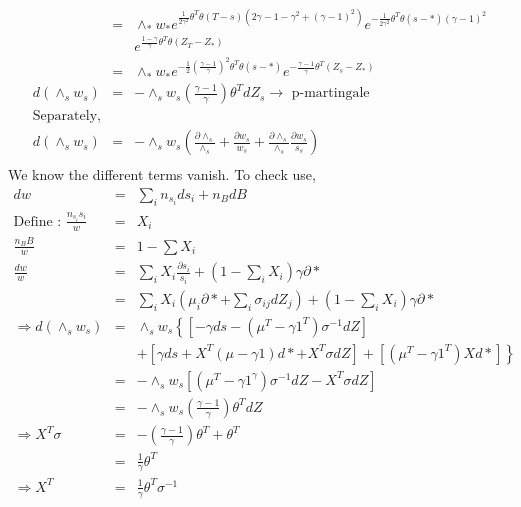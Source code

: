 \documentclass[]{article}
\begin{document}
\begin{eqnarray*}
&=& \wedge _* w_* e^{\frac{1}{2\gamma ^2} \theta ^T \theta \left(T-s\right)\left(2\gamma -1-\gamma ^2 + \left( \gamma -1\right)^2 \right)} e^{-\frac{1}{2\gamma ^2} \theta ^T \theta \left(s-*\right)\left(\gamma -1\right)^2}\\ && e^{\frac{1-\gamma}{\gamma} \theta ^T \theta \left(Z_T - Z_*\right)}\\
&=& \wedge _* w_* e^{-\frac{1}{2} \left(\frac{\gamma -1}{\gamma}\right)^2 \theta ^T \theta \left(s-*\right)} e^{-\frac{\gamma - 1}{\gamma} \theta ^T \left(Z_s-Z_*\right)}\\
d\left(\wedge _s w_s\right) &=& -\wedge _s w_s \left(\frac{\gamma -1}{\gamma}\right) \theta ^T dZ_s \rightarrow \mbox{ p-martingale}\\
\mbox{Separately,}\\
d\left(\wedge _s w_s\right) &=& -\wedge _s w_s \left(\frac{\partial \wedge _s}{\wedge _s} + \frac{\partial w_s}{w_s} + \frac{\partial \wedge _s}{\wedge _s} \frac{\partial w_s}{s_s}\right)\\
\end{eqnarray*}
We know the different terms vanish. To check use,
\begin{eqnarray*}
dw &=& \sum_{i} n_{s_i} ds_i + n_B dB\\
\mbox{Define : } \frac{n_{s_i} s_i}{w} &=& X_i \\
\frac{n_B B}{w} &=& 1-\sum X_i\\
\frac{dw}{w} &=& \sum_{i} X_i \frac{\partial s_i}{s_i} + \left( 1- \sum_{i} X_i\right) \gamma \partial * \\
&=& \sum_{i} X_i \left( \mu _i \partial * + \sum_{i} \sigma _{ij} dZ_j \right) + \left( 1- \sum_{i} X_i\right) \gamma \partial *\\
\Rightarrow d\left(\wedge _s w_s\right) &=& \wedge _s w_s \left\{ \left[ -\gamma ds - \left(\mu ^T - \gamma 1^T\right)\sigma^{-1} dZ \right] \right. \\
&&+\left. \left[\gamma ds + X^T \left(\mu -\gamma 1\right)d* + X^T \sigma dZ\right] + \left[\left(\mu ^T - \gamma 1^T\right) X d*\right]\right\}\\
&=& -\wedge _s w_s \left[ \left(\mu ^T - \gamma 1^\gamma \right) \sigma ^{-1} dZ - X^T \sigma dZ\right] \\
&=& -\wedge _s w_s \left( \frac{\gamma -1}{\gamma} \right) \theta ^T dZ \\
\Rightarrow X^T \sigma &=& -\left( \frac{\gamma -1}{\gamma} \right) \theta ^T + \theta ^T\\
&=& \frac{1}{\gamma} \theta ^T\\
\Rightarrow X^T &=& \frac{1}{\gamma} \theta ^T \sigma ^{-1}
\end{eqnarray*}
\end{document}
